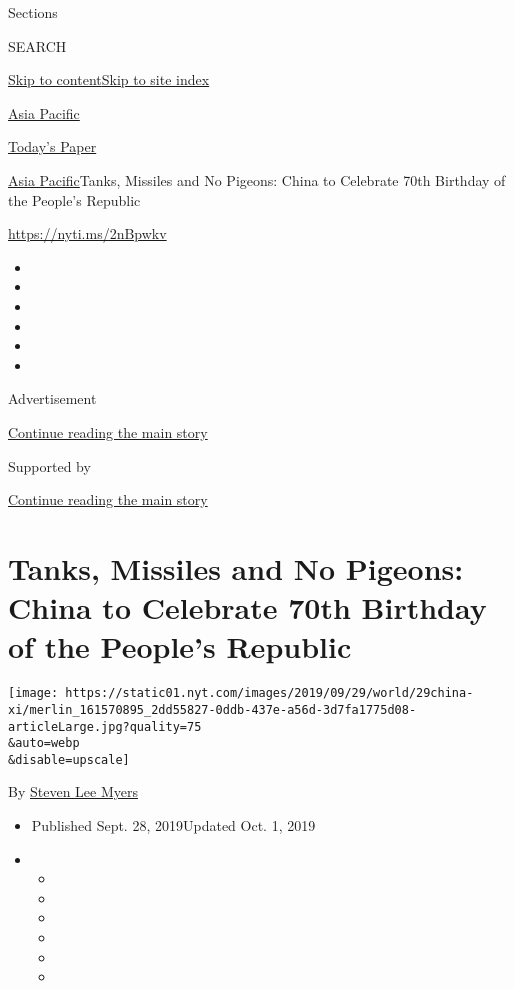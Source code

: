 Sections

SEARCH

\protect\hyperlink{site-content}{Skip to
content}\protect\hyperlink{site-index}{Skip to site index}

\href{https://www.nytimes.com/section/world/asia}{Asia Pacific}

\href{https://myaccount.nytimes.com/auth/login?response_type=cookie\&client_id=vi}{}

\href{https://www.nytimes.com/section/todayspaper}{Today's Paper}

\href{/section/world/asia}{Asia Pacific}\textbar{}Tanks, Missiles and No
Pigeons: China to Celebrate 70th Birthday of the People's Republic

\url{https://nyti.ms/2nBpwkv}

\begin{itemize}
\item
\item
\item
\item
\item
\item
\end{itemize}

Advertisement

\protect\hyperlink{after-top}{Continue reading the main story}

Supported by

\protect\hyperlink{after-sponsor}{Continue reading the main story}

\hypertarget{tanks-missiles-and-no-pigeons-china-to-celebrate-70th-birthday-of-the-peoples-republic}{%
\section{Tanks, Missiles and No Pigeons: China to Celebrate 70th
Birthday of the People's
Republic}\label{tanks-missiles-and-no-pigeons-china-to-celebrate-70th-birthday-of-the-peoples-republic}}

\texttt{[image: https://static01.nyt.com/images/2019/09/29/world/29china-xi/merlin\_161570895\_2dd55827-0ddb-437e-a56d-3d7fa1775d08-articleLarge.jpg?quality=75\\\&auto=webp\\\&disable=upscale]}

By \href{https://www.nytimes.com/by/steven-lee-myers}{Steven Lee Myers}

\begin{itemize}
\item
  Published Sept. 28, 2019Updated Oct. 1, 2019
\item
  \begin{itemize}
  \item
  \item
  \item
  \item
  \item
  \item
  \end{itemize}
\end{itemize}

